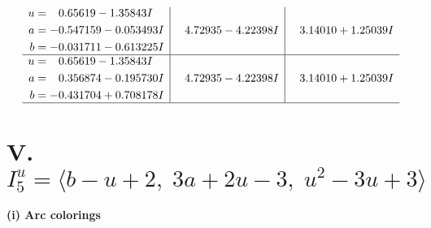 \documentclass[1p]{elsarticle_modified}
\theoremstyle{definition}
\begin{document}
$$\begin{array}{c|c|c}
\begin{aligned}
u &= \phantom{-}0.65619 - 1.35843 I \\
a &= -0.547159 - 0.053493 I \\
b &= -0.031711 - 0.613225 I\end{aligned}
 & \phantom{-}4.72935 - 4.22398 I & \phantom{-}3.14010 + 1.25039 I \\ \hline\begin{aligned}
u &= \phantom{-}0.65619 - 1.35843 I \\
a &= \phantom{-}0.356874 - 0.195730 I \\
b &= -0.431704 + 0.708178 I\end{aligned}
 & \phantom{-}4.72935 - 4.22398 I & \phantom{-}3.14010 + 1.25039 I\\
 \hline 
 \end{array}$$\newpage\newpage\renewcommand{\arraystretch}{1}
\centering \section*{V. $I^u_{5}= \langle b- u+2,\;3 a+2 u-3,\;u^2-3 u+3 \rangle$}
\flushleft \textbf{(i) Arc colorings}\\
\end{document}
